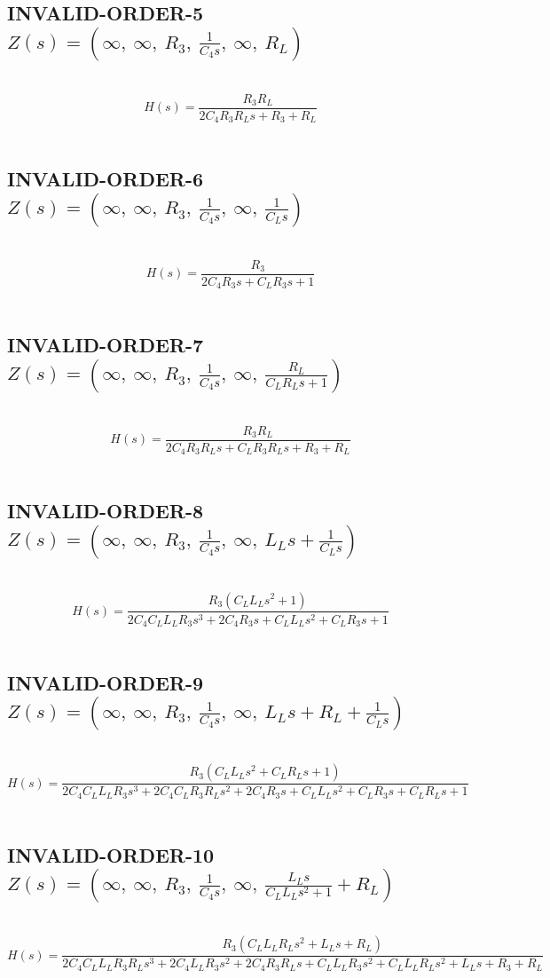 \documentclass{article}
\begin{document}
\subsection{INVALID-ORDER-5 $Z(s) = \left( \infty, \  \infty, \  R_{3}, \  \frac{1}{C_{4} s}, \  \infty, \  R_{L}\right)$ } \ 
\textbf{\[H(s) = \frac{R_{3} R_{L}}{2 C_{4} R_{3} R_{L} s + R_{3} + R_{L}}\] } \ 
\subsection{INVALID-ORDER-6 $Z(s) = \left( \infty, \  \infty, \  R_{3}, \  \frac{1}{C_{4} s}, \  \infty, \  \frac{1}{C_{L} s}\right)$ } \ 
\textbf{\[H(s) = \frac{R_{3}}{2 C_{4} R_{3} s + C_{L} R_{3} s + 1}\] } \ 
\subsection{INVALID-ORDER-7 $Z(s) = \left( \infty, \  \infty, \  R_{3}, \  \frac{1}{C_{4} s}, \  \infty, \  \frac{R_{L}}{C_{L} R_{L} s + 1}\right)$ } \ 
\textbf{\[H(s) = \frac{R_{3} R_{L}}{2 C_{4} R_{3} R_{L} s + C_{L} R_{3} R_{L} s + R_{3} + R_{L}}\] } \ 
\subsection{INVALID-ORDER-8 $Z(s) = \left( \infty, \  \infty, \  R_{3}, \  \frac{1}{C_{4} s}, \  \infty, \  L_{L} s + \frac{1}{C_{L} s}\right)$ } \ 
\textbf{\[H(s) = \frac{R_{3} \left(C_{L} L_{L} s^{2} + 1\right)}{2 C_{4} C_{L} L_{L} R_{3} s^{3} + 2 C_{4} R_{3} s + C_{L} L_{L} s^{2} + C_{L} R_{3} s + 1}\] } \ 
\subsection{INVALID-ORDER-9 $Z(s) = \left( \infty, \  \infty, \  R_{3}, \  \frac{1}{C_{4} s}, \  \infty, \  L_{L} s + R_{L} + \frac{1}{C_{L} s}\right)$ } \ 
\textbf{\[H(s) = \frac{R_{3} \left(C_{L} L_{L} s^{2} + C_{L} R_{L} s + 1\right)}{2 C_{4} C_{L} L_{L} R_{3} s^{3} + 2 C_{4} C_{L} R_{3} R_{L} s^{2} + 2 C_{4} R_{3} s + C_{L} L_{L} s^{2} + C_{L} R_{3} s + C_{L} R_{L} s + 1}\] } \ 
\subsection{INVALID-ORDER-10 $Z(s) = \left( \infty, \  \infty, \  R_{3}, \  \frac{1}{C_{4} s}, \  \infty, \  \frac{L_{L} s}{C_{L} L_{L} s^{2} + 1} + R_{L}\right)$ } \ 
\textbf{\[H(s) = \frac{R_{3} \left(C_{L} L_{L} R_{L} s^{2} + L_{L} s + R_{L}\right)}{2 C_{4} C_{L} L_{L} R_{3} R_{L} s^{3} + 2 C_{4} L_{L} R_{3} s^{2} + 2 C_{4} R_{3} R_{L} s + C_{L} L_{L} R_{3} s^{2} + C_{L} L_{L} R_{L} s^{2} + L_{L} s + R_{3} + R_{L}}\] } \ 
\end{document}
